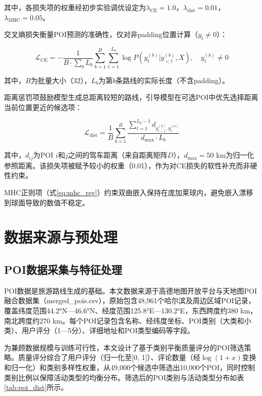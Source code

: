 \documentclass[12pt,a4paper]{ctexart}
\begin{document}
其中，各损失项的权重经初步实验调优设定为$\lambda_{\text{CE}}=1.0$，$\lambda_{\text{dist}}=0.01$，$\lambda_{\text{MHC}}=0.05$。

交叉熵损失衡量POI预测的准确性，仅对非padding位置计算（$y_t\neq 0$）：

\begin{equation}
\mathcal{L}_{\text{CE}} = -\frac{1}{B\cdot\sum_b L_b}\sum_{b=1}^{B}\sum_{t=1}^{L_b}\log P(y_t^{(b)}|y_{<t}^{(b)},X),\quad y_t^{(b)}\neq 0
\label{eq:ce}
\end{equation}

其中，$B$为批量大小（32），$L_b$为第$b$条路线的实际长度（不含padding）。

距离惩罚项鼓励模型生成总距离较短的路线，引导模型在可选POI中优先选择距离当前位置更近的候选项：

\begin{equation}
\mathcal{L}_{\text{dist}} = \frac{1}{B}\sum_{b=1}^{B}\frac{\sum_{t=1}^{L_b-1}d_{y_{t-1}^{(b)},y_t^{(b)}}}{d_{\max}\cdot L_b}
\label{eq:dist_loss}
\end{equation}

其中，$d_{ij}$为POI $i$和$j$之间的驾车距离（来自距离矩阵$D$），$d_{\max}=50$ km为归一化参照距离。该损失项被赋予较小的权重（0.01），作为对CE损失的软性补充而非硬性约束。

MHC正则项（式\ref{eq:mhc_reg}）约束双曲嵌入保持在庞加莱球内，避免嵌入漂移到球面导致的数值不稳定。

\section{数据来源与预处理}

\subsection{POI数据采集与特征处理}

POI数据是旅游路线生成的基础。本文数据来源于高德地图开放平台与天地图POI融合数据集（merged\_pois.csv），原始包含48,961个哈尔滨及周边区域POI记录，覆盖纬度范围44.2°N—46.6°N、经度范围125.8°E—130.2°E，东西跨度约380 km，南北跨度约270 km。每个POI记录包含名称、经纬度坐标、POI类别（大类和小类）、用户评分（1—5分）、详细地址和POI类型编码等字段。

为兼顾数据规模与训练可行性，本文设计了基于类别平衡质量评分的POI筛选策略。质量评分综合了用户评分（归一化至[0, 1]）、评论数量（经$\log(1+x)$变换和归一化）和类别多样性权重，从49,000个候选中筛选出10,000个POI，同时控制类别比例以保障活动类型的均衡分布。筛选后的POI类别与活动类型分布如表\ref{tab:poi_dist}所示。
\end{document}
